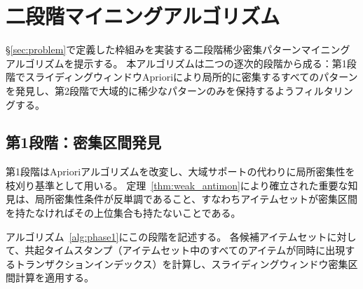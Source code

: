 \section{二段階マイニングアルゴリズム}\label{sec:algorithm}

\S\ref{sec:problem}で定義した枠組みを実装する二段階稀少密集パターンマイニングアルゴリズムを提示する。
本アルゴリズムは二つの逐次的段階から成る：第1段階でスライディングウィンドウAprioriにより局所的に密集するすべてのパターンを発見し、第2段階で大域的に稀少なパターンのみを保持するようフィルタリングする。

\subsection{第1段階：密集区間発見}

第1段階はAprioriアルゴリズムを改変し、大域サポートの代わりに局所密集性を枝刈り基準として用いる。
定理~\ref{thm:weak_antimon}により確立された重要な知見は、局所密集性条件が反単調であること、すなわちアイテムセットが密集区間を持たなければその上位集合も持たないことである。

アルゴリズム~\ref{alg:phase1}にこの段階を記述する。
各候補アイテムセットに対して、共起タイムスタンプ（アイテムセット中のすべてのアイテムが同時に出現するトランザクションインデックス）を計算し、スライディングウィンドウ密集区間計算を適用する。


